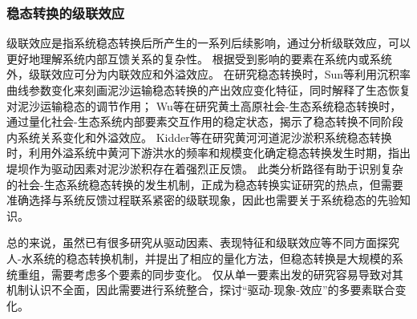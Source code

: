 \subsubsection{稳态转换的级联效应}

级联效应是指系统稳态转换后所产生的一系列后续影响，通过分析级联效应，可以更好地理解系统内部互馈关系的复杂性\cite{rocha2018}。
根据受到影响的要素在系统内或系统外，级联效应可分为内联效应和外溢效应\cite{rocha2018}。
在研究稳态转换时，Sun等利用沉积率曲线参数变化来刻画泥沙运输稳态转换的产出效应变化特征，同时解释了生态恢复对泥沙运输稳态的调节作用\cite{sun2020}；
Wu等在研究黄土高原社会-生态系统稳态转换时，通过量化社会-生态系统内部要素交互作用的稳定状态，揭示了稳态转换不同阶段内系统关系变化和外溢效应\cite{wu2020a}。
Kidder等在研究黄河河道泥沙淤积系统稳态转换时，利用外溢系统中黄河下游洪水的频率和规模变化确定稳态转换发生时期，指出堤坝作为驱动因素对泥沙淤积存在着强烈正反馈\cite{kidder2015}。
此类分析路径有助于识别复杂的社会-生态系统稳态转换的发生机制，正成为稳态转换实证研究的热点，但需要准确选择与系统反馈过程联系紧密的级联现象，因此也需要关于系统稳态的先验知识。

总的来说，虽然已有很多研究从驱动因素、表现特征和级联效应等不同方面探究人-水系统的稳态转换机制，并提出了相应的量化方法，但稳态转换是大规模的系统重组，需要考虑多个要素的同步变化。
仅从单一要素出发的研究容易导致对其机制认识不全面，因此需要进行系统整合，探讨“驱动-现象-效应”的多要素联合变化。
